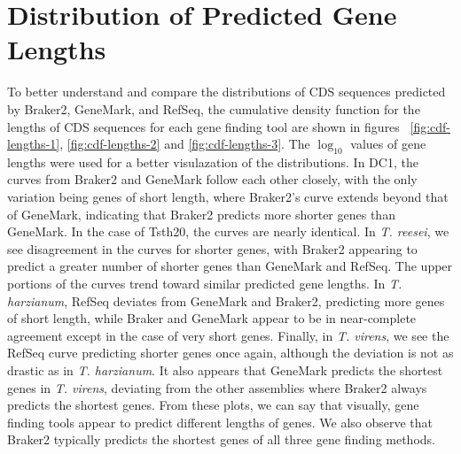 \section{Distribution of Predicted Gene Lengths}
\label{section:lengths}

To better understand and compare the distributions of CDS sequences
predicted by Braker2, GeneMark, and RefSeq, the cumulative density
function for the lengths of CDS sequences for each gene finding tool
are shown in figures ~\ref{fig:cdf-lengths-1}, \ref{fig:cdf-lengths-2}
and \ref{fig:cdf-lengths-3}. The $\log_{10}$ values of gene lengths
were used for a better visulazation of the distributions. In DC1, the
curves from Braker2 and GeneMark follow each other closely, with the
only variation being genes of short length, where Braker2's curve
extends beyond that of GeneMark, indicating that Braker2 predicts more
shorter genes than GeneMark. In the case of Tsth20, the curves are
nearly identical. In \textit{T. reesei}, we see disagreement in the
curves for shorter genes, with Braker2 appearing to predict a greater
number of shorter genes than GeneMark and RefSeq. The upper portions
of the curves trend toward similar predicted gene lengths. In
\textit{T. harzianum}, RefSeq deviates from GeneMark and Braker2,
predicting more genes of short length, while Braker and GeneMark
appear to be in near-complete agreement except in the case of very
short genes. Finally, in \textit{T. virens}, we see the RefSeq curve
predicting shorter genes once again, although the deviation is not as
drastic as in \textit{T. harzianum}. It also appears that GeneMark
predicts the shortest genes in \textit{T. virens}, deviating from the
other assemblies where Braker2 always predicts the shortest
genes. From these plots, we can say that visually, gene finding tools
appear to predict different lengths of genes. We also observe that
Braker2 typically predicts the shortest genes of all three gene
finding methods.

